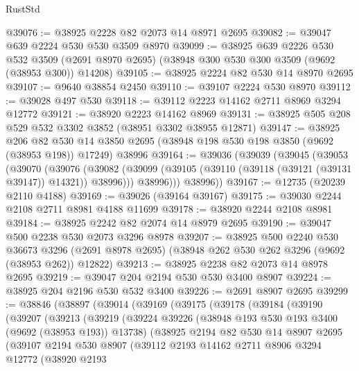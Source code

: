 \begin{lexlean}{RustStd}
\begin{coremodule}
{\begin{coremodule}
{{{{{{{{{{{{{{{{{{{{{{{{{{{{{{{{{{{{{{{{{{{{{{{{{{{{{{{@39076 := @38925 @2228 @82 @2073 @14 @8971 @2695
@39082 := @39047 @639 @2224 @530 @530 @3509 @8970
@39099 := @38925
    @639
    @2226
    @530
    @532
    @3509
    (@2691 @8970 @2695)
    (@38948 @300 @530 @300 @3509 (@9692 (@38953 @300)) @14208)
@39105 := @38925 @2224 @82 @530 @14 @8970 @2695
@39107 := @9640 @38854 @2450
@39110 := @39107 @2224 @530 @8970
@39112 := @39028 @497 @530
@39118 := @39112 @2223 @14162 @2711 @8969 @3294 @12772
@39121 := @38920 @2223 @14162 @8969
@39131 := @38925 @505 @208 @529 @532 @3302 @3852 (@38951 @3302 @38955 @12871)
@39147 := @38925
    @206
    @82
    @530
    @14
    @3850
    @2695
    (@38948 @198 @530 @198 @3850 (@9692 (@38953 @198)) @17249)
    @38996
@39164 := @39036
    (@39039
      (@39045
        (@39053
          (@39070
            (@39076
              (@39082 (@39099 (@39105 (@39110 (@39118 (@39121 (@39131 @39147)) @14321)) @38996)))
              @38996)))
        @38996))
@39167 := @12735 (@20239 @2110 @4188)
@39169 := @39026 (@39164 @39167)
@39175 := @39030 @2244 @2108 @2711 @8981 @4188 @11699
@39178 := @38920 @2244 @2108 @8981
@39184 := @38925 @2242 @82 @2074 @14 @8979 @2695
@39190 := @39047 @500 @2238 @530 @2073 @3296 @8978
@39207 := @38925
    @500
    @2240
    @530
    @36673
    @3296
    (@2691 @8978 @2695)
    (@38948 @262 @530 @262 @3296 (@9692 (@38953 @262)) @12822)
@39213 := @38925 @2238 @82 @2073 @14 @8978 @2695
@39219 := @39047 @204 @2194 @530 @530 @3400 @8907
@39224 := @38925 @204 @2196 @530 @532 @3400
@39226 := @2691 @8907 @2695
@39299 := @38846
    (@38897
      (@39014
        (@39169
          (@39175
            (@39178
              (@39184
                (@39190
                  (@39207
                    (@39213
                      (@39219
                        (@39224
                          @39226
                          (@38948 @193 @530 @193 @3400 (@9692 (@38953 @193)) @13738)
                          (@38925
                            @2194
                            @82
                            @530
                            @14
                            @8907
                            @2695
                            (@39107
                              @2194
                              @530
                              @8907
                              (@39112
                                @2193
                                @14162
                                @2711
                                @8906
                                @3294
                                @12772
                                (@38920
                                  @2193
}}}}}}}}}}}}}}}}}}}}}}}}}}}}}}}}}}}}}}}}}}}}}}}}}}}}}}}
\end{coremodule}}
\end{coremodule}
\end{lexlean}
